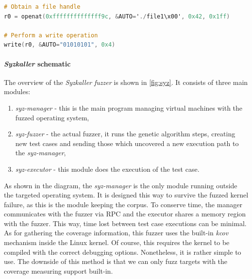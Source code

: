 \begin{minipage}\linewidth
    \begin{lstlisting}[language=C,caption={\textit{Syzkaller} DSL describing syscalls \cite{syzkaller_repo}.},captionpos=b,label={syzkaller_dsl}]
# Obtain a file handle
r0 = openat(0xffffffffffffff9c, &AUTO='./file1\x00', 0x42, 0x1ff)

# Perform a write operation
write(r0, &AUTO="01010101", 0x4)
    \end{lstlisting} 
\end{minipage}

\paragraph{\textit{Syzkaller} schematic}

The overview of the \textit{Syzkaller fuzzer} is shown in \ref{fig:syz}. It consists of three main modules:
\begin{enumerate}
    \item \textit{syz-manager} - this is the main program managing virtual machines with the fuzzed operating system,
    \item \textit{syz-fuzzer} - the actual fuzzer, it runs the genetic algorithm steps, creating new test cases and sending those which uncovered a new execution path to the \textit{syz-manager},
    \item \textit{syz-executor} - this module does the execution of the test case.
\end{enumerate}
As shown in the diagram, the \textit{syz-manager} is the only module running outside the targeted operating system. It is designed this way to survive the fuzzed kernel failure, as this is the module keeping the corpus. To conserve time, the manager communicates with the fuzzer via RPC and the executor shares a memory region with the fuzzer. This way, time lost between test case executions can be minimal. As for gathering the coverage information, this fuzzer uses the built-in \textit{kcov} mechanism inside the Linux kernel. Of course, this requires the kernel to be compiled with the correct debugging options. Nonetheless, it is rather simple to use. The downside of this method is that we can only fuzz targets with the coverage measuring support built-in.

